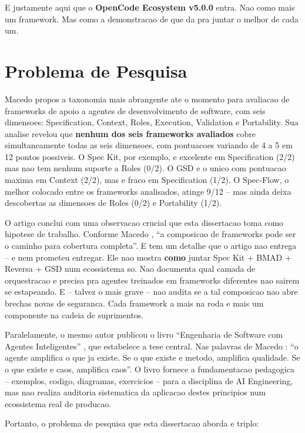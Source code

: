 \documentclass[12pt,a4paper,oneside,sumario=tradicional,chapter=TITLE,section=TITLE,subsection=TITLE,english,brazil]{abntex2}
\begin{document}
E justamente aqui que o \textbf{OpenCode Ecosystem v5.0.0} entra. Nao como mais um framework. Mas como a demonstracao de que da pra juntar o melhor de cada um.

\section{Problema de Pesquisa}

Macedo \cite{macedo2026fromprompt} propos a taxonomia mais abrangente ate o momento para avaliacao de frameworks de apoio a agentes de desenvolvimento de software, com seis dimensoes: Specification, Context, Roles, Execution, Validation e Portability. Sua analise revelou que \textbf{nenhum dos seis frameworks avaliados} cobre simultaneamente todas as seis dimensoes, com pontuacoes variando de 4 a 5 em 12 pontos possiveis. O Spec Kit, por exemplo, e excelente em Specification (2/2) mas nao tem nenhum suporte a Roles (0/2). O GSD e o unico com pontuacao maxima em Context (2/2), mas e fraco em Specification (1/2). O Spec-Flow, o melhor colocado entre os frameworks analisados, atinge 9/12 -- mas ainda deixa descobertas as dimensoes de Roles (0/2) e Portability (1/2).

O artigo conclui com uma observacao crucial que esta dissertacao toma como hipotese de trabalho. Conforme Macedo \cite[p. 15]{macedo2026fromprompt}, ``a composicao de frameworks pode ser o caminho para cobertura completa''. E tem um detalhe que o artigo nao entrega -- e nem prometeu entregar. Ele nao mostra \textbf{como} juntar Spec Kit + BMAD + Reversa + GSD num ecossistema so. Nao documenta qual camada de orquestracao e precisa pra agentes treinados em frameworks diferentes nao sairem se estapeando. E -- talvez o mais grave -- nao audita se a tal composicao nao abre brechas novas de seguranca. Cada framework a mais na roda e mais um componente na cadeia de suprimentos.

Paralelamente, o mesmo autor publicou o livro ``Engenharia de Software com Agentes Inteligentes'' \cite{macedo2026engenharia}, que estabelece a tese central. Nas palavras de Macedo \cite[Cap. 2.7]{macedo2026engenharia}: ``o agente amplifica o que ja existe. Se o que existe e metodo, amplifica qualidade. Se o que existe e caos, amplifica caos''. O livro fornece a fundamentacao pedagogica -- exemplos, codigo, diagramas, exercicios -- para a disciplina de AI Engineering, mas nao realiza auditoria sistematica da aplicacao destes principios num ecossistema real de producao.

Portanto, o problema de pesquisa que esta dissertacao aborda e triplo:
\end{document}
